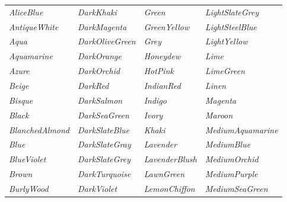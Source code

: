 \documentclass{article}
\newcommand\myfcolorbox[1]{\fcolorbox{black}{#1}{\phantom{\tiny{color}}} \textit{#1}\quad}
\begin{document}
	\begin{center}
		\begin{tabular}{llll}
			\myfcolorbox{AliceBlue} & \myfcolorbox{DarkKhaki} & \myfcolorbox{Green} & \myfcolorbox{LightSlateGrey} \\ 
			
			\myfcolorbox{AntiqueWhite} & \myfcolorbox{DarkMagenta} & \myfcolorbox{GreenYellow} & \myfcolorbox{LightSteelBlue} \\
			
			\myfcolorbox{Aqua} & \myfcolorbox{DarkOliveGreen} & \myfcolorbox{Grey} & \myfcolorbox{LightYellow} \\
			
			\myfcolorbox{Aquamarine} & \myfcolorbox{DarkOrange} & \myfcolorbox{Honeydew} & \myfcolorbox{Lime} \\
			
			\myfcolorbox{Azure} & \myfcolorbox{DarkOrchid} & \myfcolorbox{HotPink} & \myfcolorbox{LimeGreen} \\
			
			\myfcolorbox{Beige} & \myfcolorbox{DarkRed} & \myfcolorbox{IndianRed} & \myfcolorbox{Linen} \\
			
			\myfcolorbox{Bisque} & \myfcolorbox{DarkSalmon} & \myfcolorbox{Indigo} & \myfcolorbox{Magenta} \\
			
			\myfcolorbox{Black} & \myfcolorbox{DarkSeaGreen} & \myfcolorbox{Ivory} & \myfcolorbox{Maroon} \\
			
			\myfcolorbox{BlanchedAlmond} & \myfcolorbox{DarkSlateBlue} & \myfcolorbox{Khaki} & \myfcolorbox{MediumAquamarine} \\
			
			\myfcolorbox{Blue} & \myfcolorbox{DarkSlateGray} & \myfcolorbox{Lavender} & \myfcolorbox{MediumBlue} \\
			
			\myfcolorbox{BlueViolet} & \myfcolorbox{DarkSlateGrey} & \myfcolorbox{LavenderBlush} & \myfcolorbox{MediumOrchid} \\
			
			\myfcolorbox{Brown} & \myfcolorbox{DarkTurquoise} & \myfcolorbox{LawnGreen} & \myfcolorbox{MediumPurple} \\
			
			\myfcolorbox{BurlyWood} & \myfcolorbox{DarkViolet} & \myfcolorbox{LemonChiffon} & \myfcolorbox{MediumSeaGreen} \\
			

\end{tabular}
\end{center}
\end{document}
